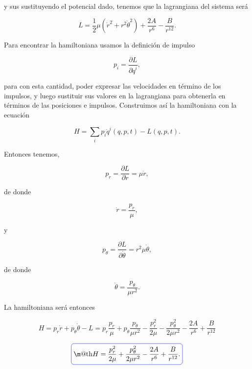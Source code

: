 \documentclass[a4paper,10pt]{article}
\makeatletter
\numberwithin{equation}{section}
\newcommand*{\boxcolor}{blue}
\renewcommand{\boxed}[1]{\textcolor{\boxcolor}{%
\tikz[baseline={([yshift=-1ex]current bounding box.center)}] \node [rectangle, minimum width=1ex,rounded corners,draw] {\normalcolor\m@th$\displaystyle#1$};}}
\makeatother
\begin{document}
y sus sustituyendo el potencial dado, tenemos que la lagrangiana del sistema será

\begin{equation}
 L = \frac{1}{2}\mu(\dot{r}^2 + r^2\dot{\theta}^2) + \frac{2A}{r^6} 
 - \frac{B}{r^{12}}.
\end{equation}

Para encontrar la hamiltoniana usamos la definición de impulso 

\begin{equation}
 p_i = \frac{\partial L}{\partial \dot{q}^i},
\end{equation}

para con esta cantidad, poder expresar las velocidades en término de los impulsos, y luego 
sustituir sus valores en la lagrangiana para obtenerla en términos de las posiciones 
e impulsos. Construimos así la hamiltoniana con la ecuación 

\begin{equation}
 H = \sum_i p_i\dot{q}^i(q,p,t) - L(q,p,t).
\end{equation}

Entonces tenemos, 

\begin{equation}
 p_r = \frac{\partial L}{\partial \dot{r}} = \mu\dot{r},
\end{equation}

de donde 

\begin{equation}
 \dot{r} = \frac{p_r}{\mu},
\end{equation}

y 

\begin{equation}
 p_\theta = \frac{\partial L}{\partial \dot{\theta}} = r^2\mu\dot{\theta},
\end{equation}

de donde 

\begin{equation}
 \dot{\theta} = \frac{p_\theta}{\mu r^2}.
\end{equation}

La hamiltoniana será entonces 

\begin{equation}
 H = p_r\dot{r} + p_\theta \dot{\theta} - L = 
 p_r\frac{p_r}{\mu} + p_\theta\frac{p_\theta}{\mu r^2} - 
 \frac{p_r^2}{2\mu} - \frac{p_\theta^2}{2\mu r^2} - \frac{2A}{r^6} 
 + \frac{B}{r^{12}}
\end{equation}

\begin{equation}
 \boxed{H = \frac{p_r^2}{2\mu} + \frac{p_\theta^2}{2\mu r^2} 
 -\frac{2A}{r^6}  + \frac{B}{r^{12}}.}
\end{equation}
\end{document}
